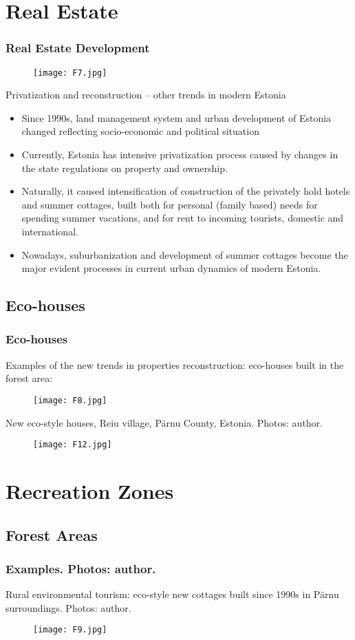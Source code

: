 \documentclass[pdflatex,compress,8pt,
	xcolor={dvipsnames,dvipsnames,svgnames,x11names,table},
]{beamer}
\begin{document}
\section{Real Estate}
\begin{frame}\frametitle{Real Estate Development}
\begin{figure}[H]
	\centering
		\texttt{[image: F7.jpg]}
\end{figure}
Privatization and reconstruction – other trends in modern Estonia
\begin{itemize}
	\item Since 1990s, land management system and urban development of Estonia changed reflecting  socio-economic and political situation
	\item Currently, Estonia has intensive privatization process caused by changes in the state regulations on property and ownership.
	\item Naturally, it caused intensification of construction of the privately hold hotels and summer cottages, built both for personal (family based) needs for spending summer vacations, and for rent to incoming tourists, domestic and international.
	\item Nowadays, suburbanization and development of summer cottages become the major evident processes in current urban dynamics of modern Estonia.
\end{itemize}
\end{frame} 

\subsection{Eco-houses}
\begin{frame}\frametitle{Eco-houses}
Examples of the new trends in properties reconstruction: eco-houses built in the forest area: 
\begin{figure}[H]
	\centering
		\texttt{[image: F8.jpg]}
\end{figure}
New eco-style houses, Reiu village, Pärnu County, Estonia. Photos: author.
\begin{figure}[H]
	\centering
		\texttt{[image: F12.jpg]}
\end{figure}
\end{frame} 

\section{Recreation Zones}
\subsection{Forest Areas}
\begin{frame}\frametitle{Examples. Photos: author.}
Rural environmental tourism: eco-style new cottages built since 1990s in Pärnu surroundings. Photos: author.
\begin{figure}[H]
	\centering
		\texttt{[image: F9.jpg]}
\end{figure}
\end{frame} 
\end{document}
